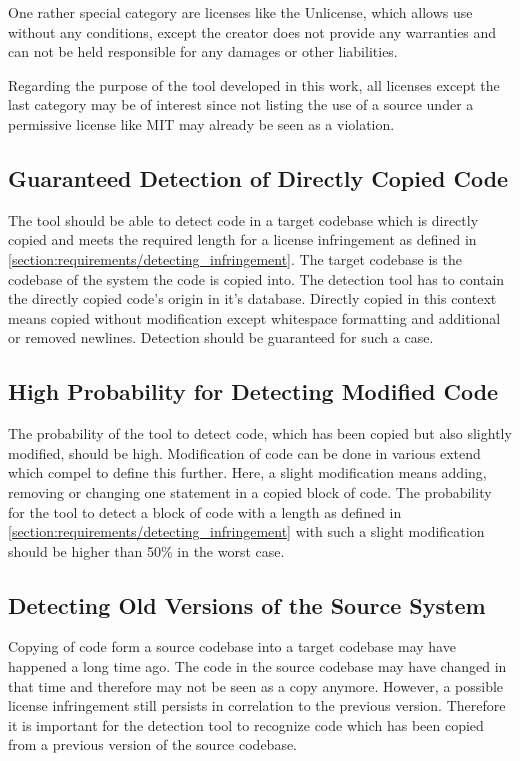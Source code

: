 One rather special category are licenses like the Unlicense, which allows use without any conditions, except the creator does not provide any warranties and can not be held responsible for any damages or other liabilities.

Regarding the purpose of the tool developed in this work, all licenses except the last category may be of interest since not listing the use of a source under a permissive license like MIT may already be seen as a violation.

\subsection{Guaranteed Detection of Directly Copied Code}\label{section:requirements/guaranteed_detection}
The tool should be able to detect code in a target codebase which is directly copied and meets the required length for a license infringement as defined in \autoref{section:requirements/detecting_infringement}.
The target codebase is the codebase of the system the code is copied into.
The detection tool has to contain the directly copied code's origin in it's database.
Directly copied in this context means copied without modification except whitespace formatting and additional or removed newlines.
Detection should be guaranteed for such a case.

\subsection{High Probability for Detecting Modified Code}\label{section:requirements/high_probability}
The probability of the tool to detect code, which has been copied but also slightly modified, should be high.
Modification of code can be done in various extend which compel to define this further.
Here, a slight modification means adding, removing or changing one statement in a copied block of code.
The probability for the tool to detect a block of code with a length as defined in \autoref{section:requirements/detecting_infringement} with such a slight modification should be higher than 50\% in the worst case. %

\subsection{Detecting Old Versions of the Source System}\label{section:requirements/detecting_old_version}
Copying of code form a source codebase into a target codebase may have happened a long time ago.
The code in the source codebase may have changed in that time and therefore may not be seen as a copy anymore.
However, a possible license infringement still persists in correlation to the previous version.
Therefore it is important for the detection tool to recognize code which has been copied from a previous version of the source codebase.

